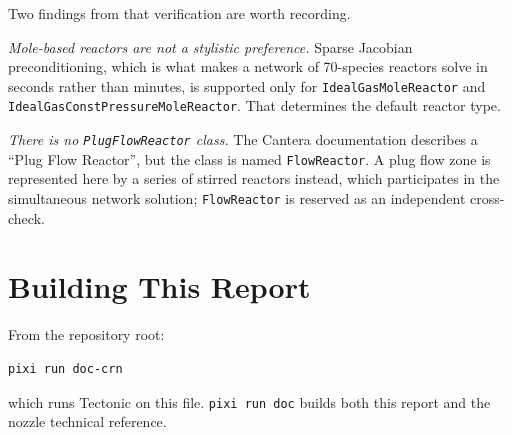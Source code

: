 \documentclass[11pt]{article}
\newcommand{\code}[1]{\nolinkurl{#1}}
\begin{document}
Two findings from that verification are worth recording.

\emph{Mole-based reactors are not a stylistic preference.} Sparse Jacobian
preconditioning, which is what makes a network of 70-species reactors solve in seconds
rather than minutes, is supported only for \code{IdealGasMoleReactor} and
\code{IdealGasConstPressureMoleReactor}. That determines the default reactor type.

\emph{There is no \code{PlugFlowReactor} class.} The Cantera documentation describes a
``Plug Flow Reactor'', but the class is named \code{FlowReactor}. A plug flow zone is
represented here by a series of stirred reactors instead, which participates in the
simultaneous network solution; \code{FlowReactor} is reserved as an independent
cross-check.

\section{Building This Report}

From the repository root:

\begin{verbatim}
pixi run doc-crn
\end{verbatim}

which runs Tectonic on this file. \code{pixi run doc} builds both this report and the
nozzle technical reference.
\end{document}
